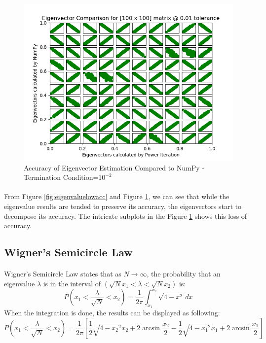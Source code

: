 \documentclass[letterpaper,12pt]{article}
\begin{document}
   \begin{figure}[H] 
      \centering \includegraphics[width=0.7\columnwidth]{figures/eigenvectorlowacc.png}           
                     \caption{Accuracy of Eigenvector Estimation Compared to NumPy - Termination Condition=$10^{-2}$}                
                        \label{fig:eigenvectorlowacc}
      \end{figure}
      \paragraph{}From Figure \ref{fig:eigenvaluelowacc} and Figure \ref{fig:eigenvectorlowacc}, we can see that while the eigenvalue results are tended to preserve its accuracy, the eigenvectors start to decompose its accuracy. The intricate subplots in the Figure \ref{fig:eigenvectorlowacc} shows this loss of accuracy.

\subsection{Wigner's Semicircle Law}
\paragraph{} Wigner's Semicircle Law states that as $N \rightarrow \infty$, the probability that an eigenvalue $\lambda$ is
in the interval of $(\sqrt{N}x_1 < \lambda < \sqrt{N}x_2)$ is:
\begin{equation*}
   P(x_1 < \frac{\lambda}{\sqrt{N}} < x_2) = \frac{1}{2\pi}\int_{x_1}^{x_2} \sqrt{4-x^2}\,dx 
\end{equation*}
When the integration is done, the results can be displayed as following:
\begin{equation*}
   P(x_1 < \frac{\lambda}{\sqrt{N}} < x_2) = \frac{1}{2\pi} \left[ \frac{1}{2}\sqrt{4-{x_2}^2}x_2 + 2 \arcsin\frac{x_2}{2} - \frac{1}{2}\sqrt{4-{x_1}^2}x_1 + 2 \arcsin\frac{x_1}{2} \right]
\end{equation*}
\end{document}
